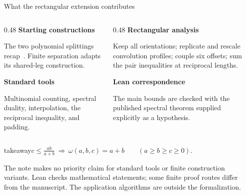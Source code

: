 \documentclass[aspectratio=169,11pt]{beamer}
\newcommand{\source}[1]{\vfill\par{\fontsize{7.5}{9}\selectfont\color{muted}#1\par}}
\newcommand{\takeaway}[1]{\begin{beamercolorbox}[sep=0.65em,wd=\linewidth]{takeaway}#1\end{beamercolorbox}}
\begin{document}
\begin{frame}{What the rectangular extension contributes}
  \begin{columns}[T,onlytextwidth]
    \begin{column}{0.48\textwidth}
      \textbf{Starting constructions}\par\medskip
      The two polynomial splittings recap~\cite{nine-fourths}.
      Finite separation adapts its shared-leg construction.\par\medskip
      \textbf{Standard tools}\par\medskip
      Multinomial counting, spectral duality, interpolation,
      the reciprocal inequality, and padding.
    \end{column}
    \begin{column}{0.48\textwidth}
      \textbf{Rectangular analysis}\par\medskip
      Keep all orientations; replicate and rescale convolution profiles;
      couple six offsets; sum the pair inequalities at reciprocal lengths.\par\medskip
      \textbf{Lean correspondence}\par\medskip
      The main bounds are checked with the published spectral theorem
      supplied explicitly as a hypothesis.
    \end{column}
  \end{columns}
  \vspace{3mm}
  \takeaway{$\displaystyle c\le\frac{ab}{a+b}\ \Longrightarrow\
  \omega(a,b,c)=a+b\qquad(a\ge b\ge c\ge0)$.}
  \source{The note makes no priority claim for standard tools or finite construction variants.
  Lean checks mathematical statements; some finite proof routes differ from the manuscript.
  The application algorithms are outside the formalization.}
\end{frame}

\renewcommand{\appendixname}{Backup}
\appendix
\end{document}
